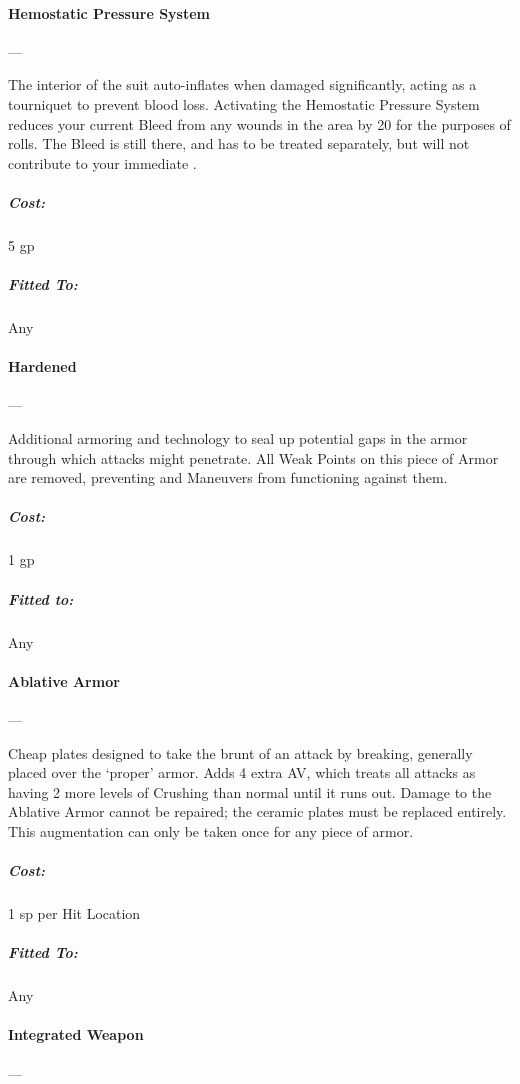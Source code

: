\documentclass[oneside,11pt,english]{book}
\begin{document}
\paragraph{Hemostatic Pressure System}---\quad[1]

The interior of the suit auto-inflates when damaged significantly, acting as a tourniquet to prevent blood 
loss. Activating the Hemostatic Pressure System reduces your current Bleed from any wounds in the area 
by 20 for the purposes of  rolls. The Bleed is still there, and has to be treated separately, but
will not contribute to your immediate .
\subparagraph{Cost:} 5 gp
\vspace{-15pt}\subparagraph{Fitted To:} Any

\paragraph{Hardened}---\quad[1]

Additional armoring and technology to seal up potential gaps in the armor through which attacks might 
penetrate. All Weak Points on this piece of Armor are removed, preventing  and  Maneuvers from functioning against them. %
\vspace{-15pt}\subparagraph{Cost:} 1 gp
\vspace{-15pt}\subparagraph{Fitted to:} Any

\paragraph{Ablative Armor}---\quad[1]

Cheap plates designed to take the brunt of an attack by breaking, generally placed over the ‘proper’ armor. Adds 4 extra AV, which treats all attacks as having 2 more levels of Crushing than normal until it runs out. Damage to the Ablative Armor cannot be repaired; the ceramic plates must be replaced entirely. This augmentation can only be taken once for any piece of armor. 
\vspace{-15pt}\subparagraph{Cost:} 1 sp per Hit Location
\vspace{-15pt}\subparagraph{Fitted To:} Any

\paragraph{Integrated Weapon}---
\end{document}
